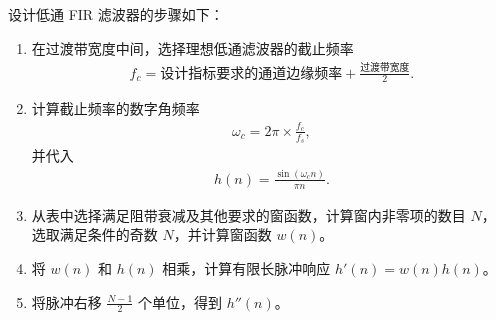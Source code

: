 \begin{example}
    设计低通 FIR 滤波器的步骤如下：
    \begin{enumerate}
        \item 在过渡带宽度中间，选择理想低通滤波器的截止频率
            \begin{align*}
                f_c = \text{设计指标要求的通道边缘频率} + \frac{\text{过渡带宽度}}{2}.
            \end{align*}
        \item 计算截止频率的数字角频率
            \begin{align*}
                \omega_c = 2\pi \times \frac{f_c}{f_s},
            \end{align*}
            并代入
            \begin{align*}
                h(n) = \frac{\sin(\omega_c n)}{\pi n}.
            \end{align*}
        \item 从表中选择满足阻带衰减及其他要求的窗函数，计算窗内非零项的数目 $N$，
            选取满足条件的奇数 $N$，并计算窗函数 $w(n)$。
        \item 将 $w(n)$ 和 $h(n)$ 相乘，计算有限长脉冲响应 $h'(n) = w(n)h(n)$。
        \item 将脉冲右移 $\frac{N - 1}{2}$ 个单位，得到 $h''(n)$。
    \end{enumerate}
\end{example}

